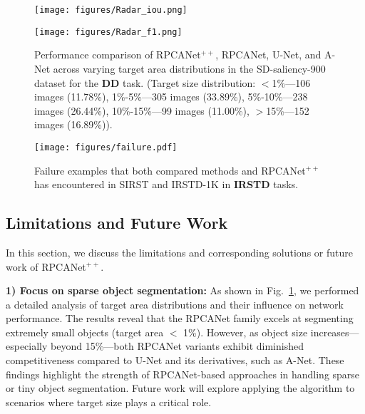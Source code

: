 \documentclass[10pt,journal,compsoc]{IEEEtran}
\begin{document}
\begin{figure}[t]
\setlength{\abovecaptionskip}{1pt} 
\setlength{\belowcaptionskip}{1pt} 
	\begin{minipage}{0.47\linewidth}
		\centerline{\texttt{[image: figures/Radar\_iou.png]}}
	\end{minipage}
    \begin{minipage}{0.47\linewidth}
		\centerline{\texttt{[image: figures/Radar\_f1.png]}}
	\end{minipage}
	\caption{Performance comparison of RPCANet$^{++}$, RPCANet, U-Net, and A-Net across varying target area distributions in the SD-saliency-900 dataset \cite{song-2020-edrnet} for the \textbf{DD} task. (Target size distribution: $<$1\%—106 images (11.78\%), 1\%-5\%—305 images (33.89\%), 5\%-10\%—238 images (26.44\%), 10\%-15\%—99 images (11.00\%), $>$15\%—152 images (16.89\%)).}
	\label{fig_dis}
\end{figure}
\begin{figure}[t]
\setlength{\abovecaptionskip}{0pt}
\setlength{\belowcaptionskip}{0pt}
    \centering
    \texttt{[image: figures/failure.pdf]}
    \caption{Failure examples that both compared methods and RPCANet$^{++}$ has encountered in  SIRST \cite{dai-2021-acm} and IRSTD-1K \cite{zhang-2022-isnet} in \textbf{IRSTD} tasks.}
    \label{fig:fail}
\end{figure}

\subsection{Limitations and Future Work}
In this section, we discuss the limitations and corresponding solutions or future work of RPCANet$^{++}$.

\noindent\textbf{1) Focus on sparse object segmentation:} As shown in Fig.~\ref{fig_dis}, we performed a detailed analysis of target area distributions and their influence on network performance. The results reveal that the RPCANet family excels at segmenting extremely small objects (target area $<$ 1\%). However, as object size increases—especially beyond 15\%—both RPCANet variants exhibit diminished competitiveness compared to U-Net and its derivatives, such as A-Net. These findings highlight the strength of RPCANet-based approaches in handling sparse or tiny object segmentation. Future work will explore applying the algorithm to scenarios where target size plays a critical role.
\end{document}
